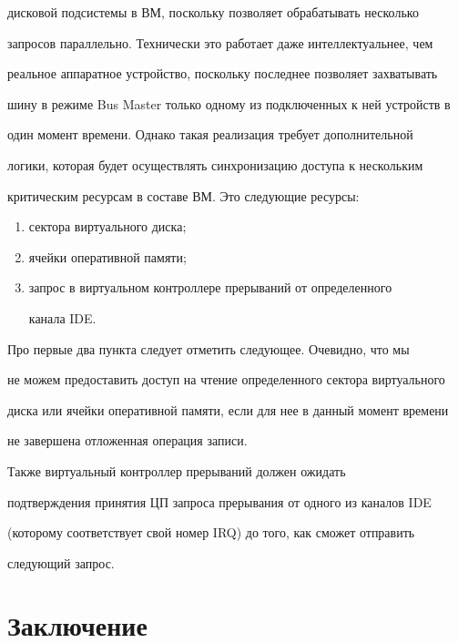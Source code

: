 дисковой подсистемы в ВМ, поскольку позволяет обрабатывать несколько 


запросов параллельно. Технически это работает даже интеллектуальнее, чем 


реальное аппаратное устройство, поскольку последнее позволяет захватывать 


шину в режиме Bus Master только одному из подключенных к ней устройств в 


один момент времени. Однако такая реализация требует дополнительной 


логики, которая будет осуществлять синхронизацию доступа к нескольким 


критическим ресурсам в составе ВМ. Это следующие ресурсы:


     \begin{enumerate}[(1)]


\item сектора виртуального диска;


\item ячейки оперативной памяти;


\item запрос в виртуальном контроллере прерываний от определенного 


канала IDE.


\end{enumerate}





     Про первые два пункта следует отметить следующее. Очевидно, что мы 


не можем предоставить доступ на чтение определенного сектора виртуального 


диска или ячейки оперативной памяти, если для нее в данный момент времени 


не завершена отложенная операция записи. 


     


     Также виртуальный контроллер прерываний должен ожидать 


подтверждения принятия ЦП запроса прерывания от одного из каналов IDE 


(которому соответствует свой номер IRQ) до того, как сможет отправить 


следующий запрос.





\section{Заключение}


